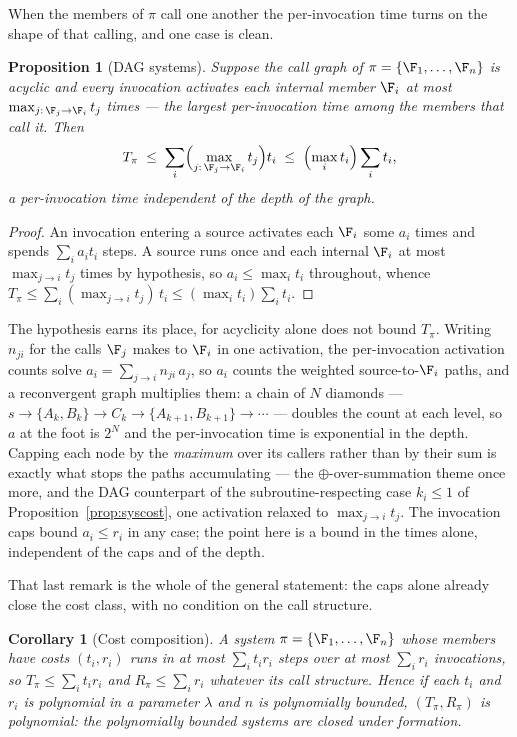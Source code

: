 \documentclass[10pt,oneside,openany]{book}
\theoremstyle{accentdef}
\theoremstyle{accentplain}
\newtheorem{proposition}[definition]{Proposition}
\newtheorem{corollary}[definition]{Corollary}
\begin{document}
When the members of $\pi$ call one another the per-invocation time turns on the shape of that
calling, and one case is clean.

\begin{proposition}[DAG systems]\label{prop:dagcost}
Suppose the call graph of $\pi = \{\F_1,\dots,\F_n\}$ is acyclic and every invocation activates
each internal member $\F_i$ at most $\max_{j:\,\F_j \to \F_i} t_j$ times --- the largest
per-invocation time among the members that call it. Then
\[
  T_\pi \;\le\; \sum_i \Bigl(\max_{j:\,\F_j \to \F_i} t_j\Bigr) t_i \;\le\; \Bigl(\max_i t_i\Bigr) \sum_i t_i ,
\]
a per-invocation time independent of the depth of the graph.
\end{proposition}

\begin{proof}
An invocation entering a source activates each $\F_i$ some $a_i$ times and spends $\sum_i a_i t_i$
steps. A source runs once and each internal $\F_i$ at most $\max_{j \to i} t_j$ times by hypothesis,
so $a_i \le \max_i t_i$ throughout, whence
$T_\pi \le \sum_i (\max_{j\to i} t_j)\, t_i \le (\max_i t_i) \sum_i t_i$.
\end{proof}

The hypothesis earns its place, for acyclicity alone does not bound $T_\pi$. Writing $n_{ji}$ for
the calls $\F_j$ makes to $\F_i$ in one activation, the per-invocation activation counts solve
$a_i = \sum_{j \to i} n_{ji}\, a_j$, so $a_i$ counts the weighted source-to-$\F_i$ paths, and a
reconvergent graph multiplies them: a chain of $N$ diamonds ---
$s \to \{A_k, B_k\} \to C_k \to \{A_{k+1}, B_{k+1}\} \to \dotsb$ --- doubles the count at each
level, so $a$ at the foot is $2^N$ and the per-invocation time is exponential in the depth. Capping
each node by the \emph{maximum} over its callers rather than by their sum is exactly what stops the
paths accumulating --- the $\oplus$-over-summation theme once more, and the DAG counterpart of the
subroutine-respecting case $k_i \le 1$ of Proposition~\ref{prop:syscost}, one activation relaxed to
$\max_{j\to i} t_j$. The invocation caps bound $a_i \le r_i$ in any case; the point here is a bound
in the times alone, independent of the caps and of the depth.

That last remark is the whole of the general statement: the caps alone already close the cost
class, with no condition on the call structure.

\begin{corollary}[Cost composition]\label{cor:costcomp}
A system $\pi = \{\F_1,\dots,\F_n\}$ whose members have costs $(t_i, r_i)$ runs in at most
$\sum_i t_i r_i$ steps over at most $\sum_i r_i$ invocations, so $T_\pi \le \sum_i t_i r_i$ and
$R_\pi \le \sum_i r_i$ whatever its call structure. Hence if each $t_i$ and $r_i$ is polynomial in
a parameter $\lambda$ and $n$ is polynomially bounded, $(T_\pi, R_\pi)$ is polynomial: the
polynomially bounded systems are closed under formation.
\end{corollary}
\end{document}
